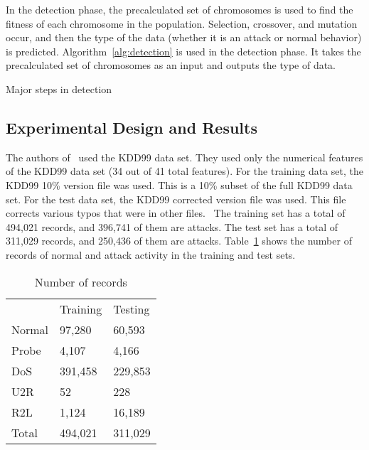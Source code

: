 \documentclass{sig-alternate}
\begin{document}
In the detection phase, the precalculated set of chromosomes is used to find the fitness of each chromosome in the population. Selection, crossover, and mutation occur, and then the type of the data (whether it is an attack or normal behavior) is predicted. Algorithm~\ref{alg:detection} is used in the detection phase. It takes the precalculated set of chromosomes as an input and outputs the type of data.

\begin{algorithm}
\caption{Major steps in detection}
\label{alg:detection}
\begin{algorithmic}
    \ENDFOR
  \ENDFOR
\ENDWHILE
\end{algorithmic}
\end{algorithm}




\subsection{Experimental Design and Results}
The authors of~\cite{DBLP:journals/corr/abs-1204-1336} used the KDD99 data set. They used only the numerical features of the KDD99 data set (34 out of 41 total features). For the training data set, the KDD99 10\% version file was used. This is a 10\% subset of the full KDD99 data set. For the test data set, the KDD99 corrected version file was used. This file corrects various typos that were in other files.~\cite{KDD99} The training set has a total of 494,021 records, and 396,741 of them are attacks. The test set has a total of 311,029 records, and 250,436 of them are attacks. Table~\ref{tab:numberOfRecords} shows the number of records of normal and attack activity in the training and test sets.

\begin{table}
\center
\caption{Number of records}
\vspace{0.20cm}
\begin{tabular}{lll}
  & Training & Testing \\ 
Normal & 97,280 & 60,593\\
Probe  & 4,107  & 4,166\\
DoS	   & 391,458 & 229,853\\
U2R    & 52      & 228\\
R2L    & 1,124   & 16,189\\
Total  & 494,021 & 311,029\\
\end{tabular}
\center
\label{tab:numberOfRecords}
\end{table}
\end{document}
